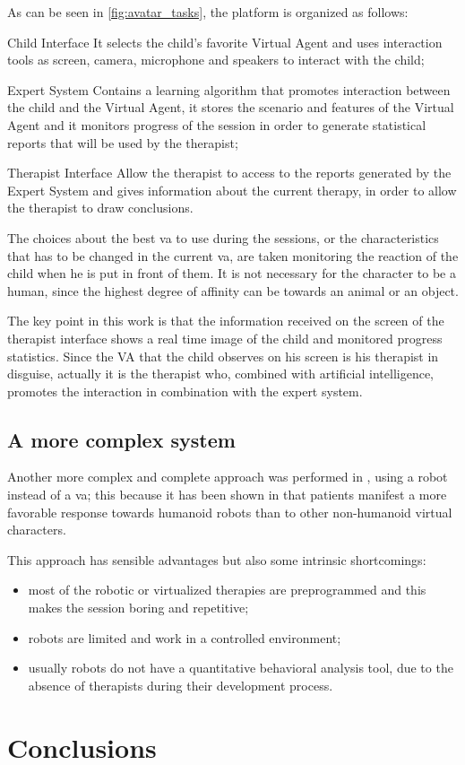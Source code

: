 \documentclass[12pt,journal,draftclsnofoot,onecolumn]{IEEEtran}
\begin{document}
As can be seen in \autoref{fig:avatar_tasks}, the platform is organized as follows:
\begin{LaTeXdescription}
	\item[Child Interface] It selects the child's favorite Virtual Agent and uses interaction tools as screen, camera, microphone and speakers to interact with the child;
	\item[Expert System] Contains a learning algorithm that promotes interaction between the child and the Virtual Agent, it stores the scenario and features of the Virtual Agent and it monitors progress of the session in order to generate statistical reports that will be used by the therapist;
	\item[Therapist Interface] Allow the therapist to access to the reports generated by the Expert System and gives information about the current therapy, in order to allow the therapist to draw conclusions.
\end{LaTeXdescription}

The choices about the best \gls{va} to use during the sessions, or the characteristics that has to be changed in the current \gls{va}, are taken monitoring the reaction of the child when he is put in front of them.
It is not necessary for the character to be a human, since the highest degree of affinity can be towards an animal or an object.

The key point in this work is that the information received on the screen of the therapist interface shows a real time image of the child and monitored progress statistics.
Since the VA that the child observes on his screen is his therapist in disguise, actually it is the therapist who, combined with artificial intelligence, promotes the interaction in combination with the expert system.

\subsection{A more complex system}
\label{sec:avatar_complex}

Another more complex and complete approach was performed in \cite{Alahbabi17}, using a robot instead of a \gls{va}; this because it has been shown in \cite{Pioggia08} that patients manifest a more favorable response towards humanoid robots than to other non-humanoid virtual characters.

This approach has sensible advantages but also some intrinsic shortcomings:
\begin{itemize}
	\item most of the robotic or virtualized therapies are preprogrammed and this makes the session boring and repetitive;
	\item robots are limited and work in a controlled environment;
	\item usually robots do not have a quantitative behavioral analysis tool, due to the absence of therapists during their development process.
\end{itemize}

\section{Conclusions}\label{sec:conclusions}




\end{document}
